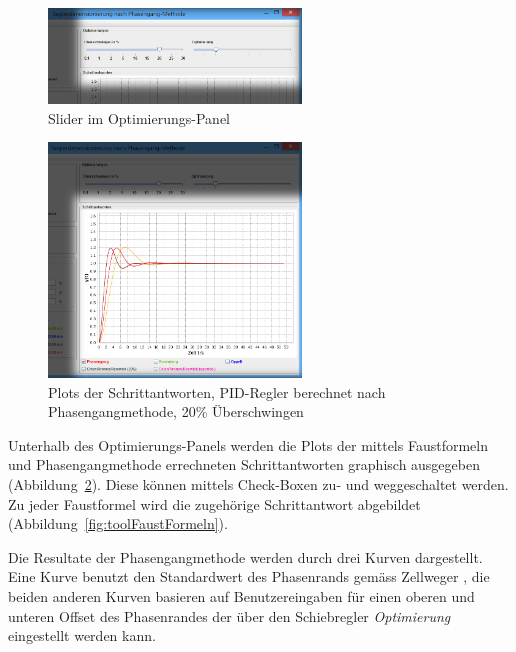\begin{figure}[h!, width=\pagewidth]
    \centering
    \includegraphics[width=0.6\textwidth]{images/tool20UeberschwingenPIDOptimierungen.jpg}
    \caption{Slider im Optimierungs-Panel}
    \label{fig:optimierungen}
\end{figure}

\begin{figure}[h!, width=\pagewidth]
    \centering
    \includegraphics[width=0.6\textwidth]{images/tool20UeberschwingenPIDPlots.jpg}
    \caption{Plots der Schrittantworten, PID-Regler berechnet nach Phasengangmethode, 20\% \"Uberschwingen}
    \label{fig:tool20Plots}
\end{figure}

Unterhalb   des    Optimierungs-Panels   werden   die   Plots    der   mittels
Faustformeln     und     Phasengangmethode    errechneten     Schrittantworten
graphisch    ausgegeben   (Abbildung~\ref{fig:tool20Plots}). Diese    k\"onnen
mittels    Check-Boxen     zu-    und    weggeschaltet     werden. Zu    jeder
Faustformel     wird     die    zugeh\"orige     Schrittantwort     abgebildet
(Abbildung~\ref{fig:toolFaustFormeln}).

Die Resultate der Phasengangmethode werden durch drei Kurven dargestellt. Eine
Kurve   benutzt   den   Standardwert  des   Phasenrands   gem\"ass   Zellweger
, die  beiden  anderen  Kurven basieren  auf
Benutzereingaben f\"ur  einen oberen und  unteren Offset des  Phasenrandes der
\"uber den Schiebregler \emph{Optimierung} eingestellt werden kann.

